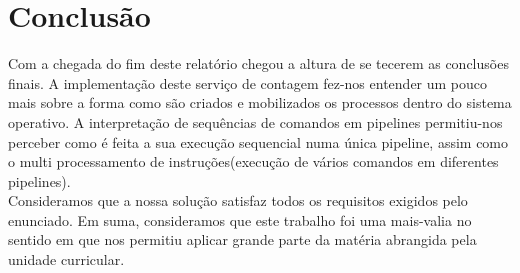 \documentclass[10pt,notitlepage]{article}
\begin{document}
\section{Conclusão}
Com a chegada do fim deste relatório chegou a altura de se tecerem as conclusões finais.
A implementação deste serviço de contagem fez-nos entender um pouco mais sobre a forma como são criados e mobilizados os processos dentro do sistema operativo. A interpretação de sequências de comandos em pipelines permitiu-nos perceber como é feita a sua execução sequencial numa única
pipeline, assim como o multi processamento de instruções(execução de vários comandos em diferentes pipelines).\\
Consideramos que a nossa solução satisfaz todos os requisitos exigidos pelo enunciado.
Em suma, consideramos que este trabalho foi uma mais-valia no sentido em que nos permitiu
aplicar grande parte da matéria abrangida pela unidade curricular.






 
\end{document}
